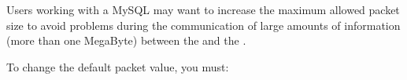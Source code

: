 Users working with a MySQL \gddb{} may want to increase the maximum allowed packet size to avoid problems during the communication of large amounts of information (more than one MegaByte) between the \gdagent{} and the \ite{}.

To change the default packet value, you must:

